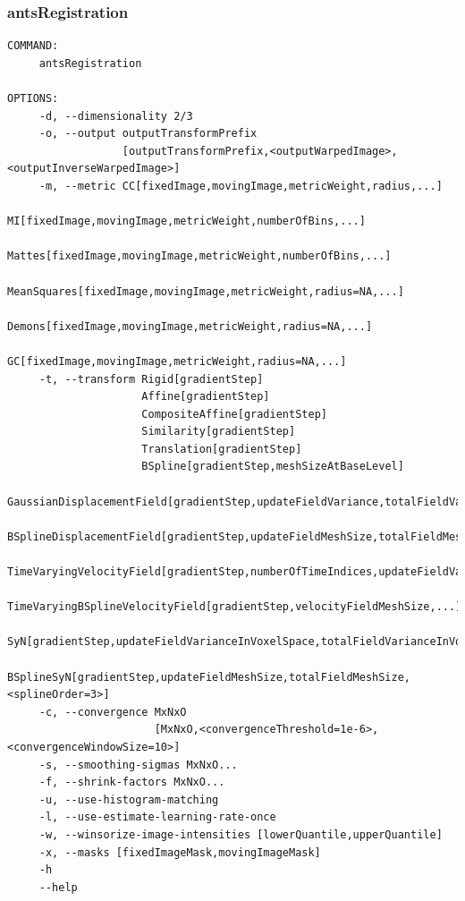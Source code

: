 \documentclass[xcolor=dvipsnames,serif,10pt]{beamer}
\begin{document}


\begin{frame}[fragile]
\frametitle{antsRegistration}
\begin{lstlisting}
COMMAND: 
     antsRegistration

OPTIONS: 
     -d, --dimensionality 2/3
     -o, --output outputTransformPrefix
                  [outputTransformPrefix,<outputWarpedImage>,<outputInverseWarpedImage>]
     -m, --metric CC[fixedImage,movingImage,metricWeight,radius,...]
                  MI[fixedImage,movingImage,metricWeight,numberOfBins,...]
                  Mattes[fixedImage,movingImage,metricWeight,numberOfBins,...]
                  MeanSquares[fixedImage,movingImage,metricWeight,radius=NA,...]
                  Demons[fixedImage,movingImage,metricWeight,radius=NA,...]
                  GC[fixedImage,movingImage,metricWeight,radius=NA,...]
     -t, --transform Rigid[gradientStep]
                     Affine[gradientStep]
                     CompositeAffine[gradientStep]
                     Similarity[gradientStep]
                     Translation[gradientStep]
                     BSpline[gradientStep,meshSizeAtBaseLevel]
                     GaussianDisplacementField[gradientStep,updateFieldVariance,totalFieldVariance]
                     BSplineDisplacementField[gradientStep,updateFieldMeshSize,totalFieldMeshSize,...]
                     TimeVaryingVelocityField[gradientStep,numberOfTimeIndices,updateFieldVariance,...]
                     TimeVaryingBSplineVelocityField[gradientStep,velocityFieldMeshSize,...]
                     SyN[gradientStep,updateFieldVarianceInVoxelSpace,totalFieldVarianceInVoxelSpace]
                     BSplineSyN[gradientStep,updateFieldMeshSize,totalFieldMeshSize,<splineOrder=3>]
     -c, --convergence MxNxO
                       [MxNxO,<convergenceThreshold=1e-6>,<convergenceWindowSize=10>]
     -s, --smoothing-sigmas MxNxO...
     -f, --shrink-factors MxNxO...
     -u, --use-histogram-matching 
     -l, --use-estimate-learning-rate-once 
     -w, --winsorize-image-intensities [lowerQuantile,upperQuantile]
     -x, --masks [fixedImageMask,movingImageMask]
     -h 
     --help 

\end{lstlisting}                 
\end{frame}
\end{document}

